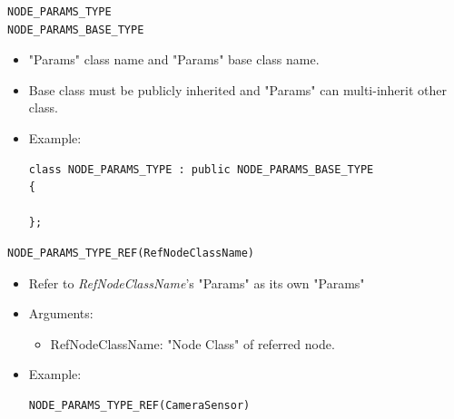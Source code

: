 \documentclass[a4paper,10pt]{book}
\begin{document}
\begin{mdframed}
\begin{verbatim}
NODE_PARAMS_TYPE
NODE_PARAMS_BASE_TYPE
\end{verbatim}
\begin{itemize}
 \item "Params" class name and "Params" base class name.
 \item Base class must be publicly inherited and "Params" can multi-inherit other class. 
\end{itemize}
\begin{itemize}
 \item Example:
 \begin{verbatim}
class NODE_PARAMS_TYPE : public NODE_PARAMS_BASE_TYPE
{

};
 \end{verbatim}
\end{itemize}
\end{mdframed}

\begin{mdframed}
\begin{verbatim}
NODE_PARAMS_TYPE_REF(RefNodeClassName)
\end{verbatim}
\begin{itemize}
 \item Refer to {\em{RefNodeClassName}}'s "Params" as its own "Params"
 \item Arguments:
 \begin{itemize}
  \item RefNodeClassName: "Node Class" of referred node.
 \end{itemize}
 \item Example:
 \begin{verbatim}
NODE_PARAMS_TYPE_REF(CameraSensor)
 \end{verbatim}
\end{itemize}
\end{mdframed}
\end{document}
